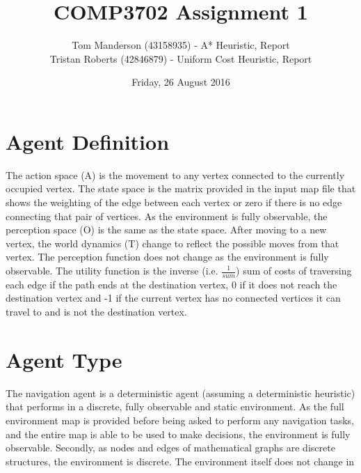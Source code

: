 \documentclass[11pt,a4paper]{article}
\title{COMP3702 Assignment 1}
\author{
Tom Manderson (43158935) - A* Heuristic, Report
\\
Tristan Roberts (42846879) - Uniform Cost Heuristic, Report
}
\date{Friday, 26 August 2016}
\begin{document}
\maketitle
\tableofcontents
\clearpage

\section{Agent Definition}
The action space (A) is the movement to any vertex connected to the currently occupied vertex. The state space is the matrix provided in the input map file that shows the weighting of the edge between each vertex or zero if there is no edge connecting that pair of vertices. As the environment is fully observable, the perception space (O) is the same as the state space. After moving to a new vertex, the world dynamics (T) change to reflect the possible moves from that vertex. The perception function does not change as the environment is fully observable. The utility function is the inverse (i.e. \(\frac{1}{sum}\)) sum of costs of traversing each edge if the path ends at the destination vertex, 0 if it does not reach the destination vertex and -1 if the current vertex has no connected vertices it can travel to and is not the destination vertex.

\section{Agent Type}
The navigation agent is a deterministic agent (assuming a deterministic heuristic) that performs in a discrete, fully observable and static environment. As the full environment map is provided before being asked to perform any navigation tasks, and the entire map is able to be used to make decisions, the environment is fully observable. Secondly, as nodes and edges of mathematical graphs are discrete structures, the environment is discrete. The environment itself does not change in any way, so the environment is also static. Finally, given a deterministic heuristic, all decisions are deterministic, so the agent itself is deterministic.


\section{Heuristic Selection}
In order for a heuristic to be a good selection, it must form a lower bound on the cost to reach the goal from a given node. For a general graph with no additional environment information, the only things that can be used in heuristics are edge distances. For all nodes but the goal node, the algorithm must traverse an outgoing edge to reach the goal. As such, it is guaranteed that the least weight of all edges outgoing from a node provides a lower bound on the distance to the goal.
\end{document}
